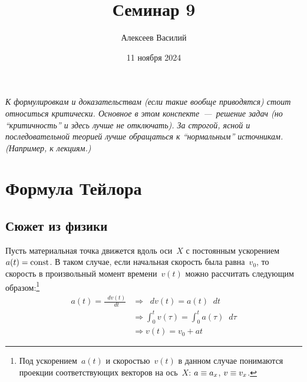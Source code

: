 \documentclass[a4paper,12pt]{article}
\author{Алексеев Василий}
\title{Семинар 9}
\date{11 ноября 2024}
\newcommand{\diff}{\mathop{}\!d}
\begin{document}
  \maketitle
  
  \tableofcontents

  \thispagestyle{empty}
  
  \newpage
  
  
  
  \vspace*{\fill}
  
  \noindent
  \emph{
    К формулировкам и доказательствам (если такие вообще приводятся) стоит относиться критически.
    Основное в этом конспекте~---~решение задач (но ``критичность'' и здесь лучше не отключать).
    За строгой, ясной и последовательной теорией лучше обращаться к ``нормальным'' источникам.
    (Например, к лекциям.)
  }
  
  \vspace*{\fill}
  
  \thispagestyle{empty}
  
  \newpage
  
  


  \section{Формула Тейлора}
  
  
  


  \subsection{Сюжет из физики}

  Пусть материальная точка движется вдоль оси~$X$ с постоянным ускорением~$a(t) \hm= \text{const}$.
  В таком случае, если начальная скорость была равна~$v_0$, то скорость в произвольный момент времени~$v(t)$ можно рассчитать следующим образом:\footnote{
    Под ускорением~$a(t)$ и скоростью~$v(t)$ в данном случае понимаются проекции соответствующих векторов на ось~$X$: $a \hm\equiv a_x$, $v \hm\equiv v_x$.
  }
  \begin{equation*}
  \begin{split}
    a(t) = \frac{\diff v(t)}{\diff t} &\Rightarrow \diff v(t) = a(t) \diff t\\
    &\Rightarrow \int_0^t v(\tau) = \int_0^t a(\tau) \diff \tau\\
    &\Rightarrow v(t) = v_0 + a t
  \end{split}
  \end{equation*}
\end{document}
